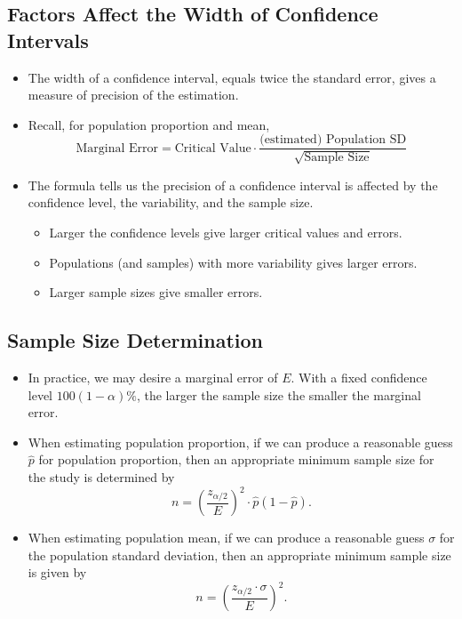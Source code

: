 \subsection{Factors Affect the Width of Confidence
Intervals}

\begin{itemize}
\item
  The width of a confidence interval, equals twice the standard error,
  gives a measure of precision of the estimation.
\item
  Recall, for population proportion and mean,
  \[\text{Marginal Error} = \text{Critical Value}\cdot \frac{\text{(estimated) Population SD}}{\sqrt{\text{Sample Size}}}\]
\item
  The formula tells us the precision of a confidence interval is
  affected by the confidence level, the variability, and the sample
  size.

  \begin{itemize}
  \item
    Larger the confidence levels give larger critical values and errors.
  \item
    Populations (and samples) with more variability gives larger errors.
  \item
    Larger sample sizes give smaller errors.
  \end{itemize}
\end{itemize}

\hypertarget{sample-size-determination}{%
\subsection{Sample Size Determination}\label{sample-size-determination}}

\begin{itemize}
\item
  In practice, we may desire a marginal error of \(E\). With a fixed
  confidence level \(100(1-\alpha)\%\), the larger the sample size the
  smaller the marginal error.
\item
  When estimating population proportion, if we can produce a reasonable
  guess \(\hat{p}\) for population proportion, then an appropriate
  minimum sample size for the study is determined by
  \[n=\left(\frac{z_{\alpha/2}}{{E}}\right)^2\cdot \hat{p}(1-\hat{p}).\]
\item
  When estimating population mean, if we can produce a reasonable guess
  \(\sigma\) for the population standard deviation, then an appropriate
  minimum sample size is given by
  \[n=\left(\dfrac{z_{\alpha/2}\cdot \sigma}{{E}}\right)^2.\]
\end{itemize}

